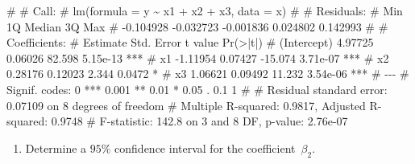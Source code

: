 \documentclass[
  a4paper,
]{article}
\newenvironment{Shaded}{\begin{snugshade}}{\end{snugshade}}
\newcommand{\NormalTok}[1]{#1}
\providecommand{\tightlist}{%
  \setlength{\itemsep}{0pt}\setlength{\parskip}{0pt}}
\theoremstyle{definition}
\theoremstyle{definition}
\theoremstyle{definition}
\theoremstyle{definition}
\theoremstyle{remark}
\begin{document}
\begin{myanswers}
\begin{Shaded}
\begin{Highlighting}[]
\NormalTok{\# }
\NormalTok{\# Call:}
\NormalTok{\# lm(formula = y \textasciitilde{} x1 + x2 + x3, data = x)}
\NormalTok{\# }
\NormalTok{\# Residuals:}
\NormalTok{\#       Min        1Q    Median        3Q       Max }
\NormalTok{\# {-}0.104928 {-}0.032723 {-}0.001836  0.024802  0.142993 }
\NormalTok{\# }
\NormalTok{\# Coefficients:}
\NormalTok{\#             Estimate Std. Error t value Pr(\textgreater{}|t|)    }
\NormalTok{\# (Intercept)  4.97725    0.06026  82.598 5.15e{-}13 ***}
\NormalTok{\# x1          {-}1.11954    0.07427 {-}15.074 3.71e{-}07 ***}
\NormalTok{\# x2           0.28176    0.12023   2.344   0.0472 *  }
\NormalTok{\# x3           1.06621    0.09492  11.232 3.54e{-}06 ***}
\NormalTok{\# {-}{-}{-}}
\NormalTok{\# Signif. codes:  0 \textquotesingle{}***\textquotesingle{} 0.001 \textquotesingle{}**\textquotesingle{} 0.01 \textquotesingle{}*\textquotesingle{} 0.05 \textquotesingle{}.\textquotesingle{} 0.1 \textquotesingle{} \textquotesingle{} 1}
\NormalTok{\# }
\NormalTok{\# Residual standard error: 0.07109 on 8 degrees of freedom}
\NormalTok{\# Multiple R{-}squared:  0.9817,  Adjusted R{-}squared:  0.9748 }
\NormalTok{\# F{-}statistic: 142.8 on 3 and 8 DF,  p{-}value: 2.76e{-}07}
\end{Highlighting}
\end{Shaded}

\end{myanswers}

\begin{enumerate}
\def\labelenumi{\alph{enumi}.}
\setcounter{enumi}{1}
\tightlist
\item
  Determine a \(95\%\) confidence interval for the coefficient~\(\beta_2\).
\end{enumerate}
\end{document}
